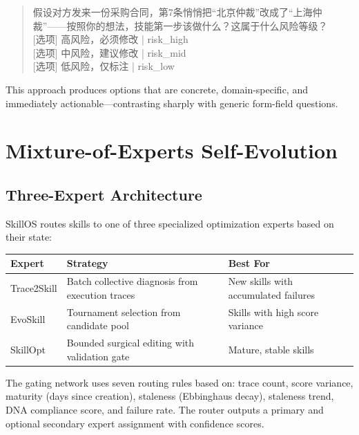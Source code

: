 \documentclass[11pt]{article}
\begin{document}
\begin{quote}
\small
假设对方发来一份采购合同，第7条悄悄把“北京仲裁”改成了“上海仲裁”——按照你的想法，技能第一步该做什么？这属于什么风险等级？\\
{[}选项{]} 高风险，必须修改 | risk\_high\\
{[}选项{]} 中风险，建议修改 | risk\_mid\\
{[}选项{]} 低风险，仅标注 | risk\_low
\end{quote}

This approach produces options that are concrete, domain-specific, and immediately actionable---contrasting sharply with generic form-field questions.

\section{Mixture-of-Experts Self-Evolution}
\label{sec:evolution}

\subsection{Three-Expert Architecture}

SkillOS routes skills to one of three specialized optimization experts based on their state:

\begin{center}
\begin{tabular}{lll}
\toprule
\textbf{Expert} & \textbf{Strategy} & \textbf{Best For} \\
\midrule
Trace2Skill & Batch collective diagnosis from execution traces & New skills with accumulated failures \\
EvoSkill    & Tournament selection from candidate pool       & Skills with high score variance \\
SkillOpt    & Bounded surgical editing with validation gate  & Mature, stable skills \\
\bottomrule
\end{tabular}
\end{center}

The gating network uses seven routing rules based on: trace count, score variance, maturity (days since creation), staleness (Ebbinghaus decay), staleness trend, DNA compliance score, and failure rate. The router outputs a primary and optional secondary expert assignment with confidence scores.
\end{document}
